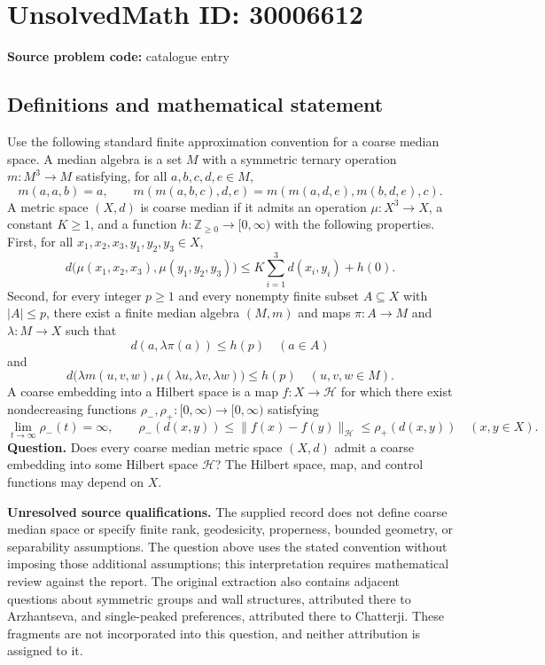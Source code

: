 \documentclass[11pt]{article}
\newcommand{\Z}{\mathbb{Z}}
\begin{document}
\section*{UnsolvedMath ID: 30006612}
\textbf{Source problem code:} catalogue entry
\subsection{Definitions and mathematical statement}
Use the following standard finite approximation convention for a coarse median space. A median algebra is a set \(M\) with a symmetric ternary operation \(m\colon M^3\to M\) satisfying, for all \(a,b,c,d,e\in M\),
\[
m(a,a,b)=a,\qquad m(m(a,b,c),d,e)=m(m(a,d,e),m(b,d,e),c).
\]
A metric space \((X,d)\) is coarse median if it admits an operation \(\mu\colon X^3\to X\), a constant \(K\geq 1\), and a function \(h\colon\Z_{\geq0}\to[0,\infty)\) with the following properties. First, for all \(x_1,x_2,x_3,y_1,y_2,y_3\in X\),
\[
d\bigl(\mu(x_1,x_2,x_3),\mu(y_1,y_2,y_3)\bigr)
\leq K\sum_{i=1}^3d(x_i,y_i)+h(0).
\]
Second, for every integer \(p\geq1\) and every nonempty finite subset \(A\subseteq X\) with \(|A|\leq p\), there exist a finite median algebra \((M,m)\) and maps \(\pi\colon A\to M\) and \(\lambda\colon M\to X\) such that
\[
d(a,\lambda\pi(a))\leq h(p)\quad(a\in A)
\]
and
\[
d\bigl(\lambda m(u,v,w),\mu(\lambda u,\lambda v,\lambda w)\bigr)\leq h(p)
\quad(u,v,w\in M).
\]
A coarse embedding into a Hilbert space is a map \(f\colon X\to\mathcal H\) for which there exist nondecreasing functions \(\rho_-,\rho_+\colon[0,\infty)\to[0,\infty)\) satisfying
\[
\lim_{t\to\infty}\rho_-(t)=\infty,\qquad
\rho_-(d(x,y))\leq\lVert f(x)-f(y)\rVert_{\mathcal H}\leq\rho_+(d(x,y))
\quad(x,y\in X).
\]
\textbf{Question.} Does every coarse median metric space \((X,d)\) admit a coarse embedding into some Hilbert space \(\mathcal H\)? The Hilbert space, map, and control functions may depend on \(X\).

\textbf{Unresolved source qualifications.} The supplied record does not define coarse median space or specify finite rank, geodesicity, properness, bounded geometry, or separability assumptions. The question above uses the stated convention without imposing those additional assumptions; this interpretation requires mathematical review against the report. The original extraction also contains adjacent questions about symmetric groups and wall structures, attributed there to Arzhantseva, and single-peaked preferences, attributed there to Chatterji. These fragments are not incorporated into this question, and neither attribution is assigned to it.
\end{document}
